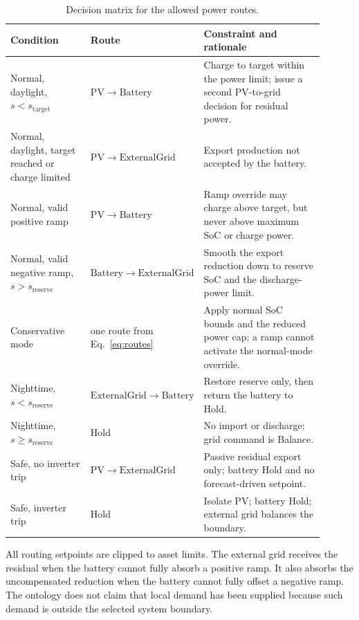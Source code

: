 \documentclass[
	letterpaper,
	10pt,
	unnumberedsections,
	twoside,
]{LTJournalArticle}
\begin{document}
\begin{table}[htbp]
\centering
\caption{Decision matrix for the allowed power routes.}
\label{tab:routing}
\small
\begin{tabular}{@{}L{0.26\linewidth}L{0.24\linewidth}L{0.40\linewidth}@{}}
\toprule
\textbf{Condition} & \textbf{Route} & \textbf{Constraint and rationale} \\
\midrule
Normal, daylight, $s<s_{\mathrm{target}}$ & $\mathrm{PV}\rightarrow\mathrm{Battery}$ & Charge to target within the power limit; issue a second PV-to-grid decision for residual power. \\
Normal, daylight, target reached or charge limited & $\mathrm{PV}\rightarrow\mathrm{ExternalGrid}$ & Export production not accepted by the battery. \\
Normal, valid positive ramp & $\mathrm{PV}\rightarrow\mathrm{Battery}$ & Ramp override may charge above target, but never above maximum SoC or charge power. \\
Normal, valid negative ramp, $s>s_{\mathrm{reserve}}$ & $\mathrm{Battery}\rightarrow\mathrm{ExternalGrid}$ & Smooth the export reduction down to reserve SoC and the discharge-power limit. \\
Conservative mode & one route from Eq.~\eqref{eq:routes} & Apply normal SoC bounds and the reduced power cap; a ramp cannot activate the normal-mode override. \\
Nighttime, $s<s_{\mathrm{reserve}}$ & $\mathrm{ExternalGrid}\rightarrow\mathrm{Battery}$ & Restore reserve only, then return the battery to Hold. \\
Nighttime, $s\geq s_{\mathrm{reserve}}$ & Hold & No import or discharge; grid command is Balance. \\
Safe, no inverter trip & $\mathrm{PV}\rightarrow\mathrm{ExternalGrid}$ & Passive residual export only; battery Hold and no forecast-driven setpoint. \\
Safe, inverter trip & Hold & Isolate PV; battery Hold; external grid balances the boundary. \\
\bottomrule
\end{tabular}
\end{table}

All routing setpoints are clipped to asset limits. The external grid receives the residual when the battery cannot fully absorb a positive ramp. It also absorbs the uncompensated reduction when the battery cannot fully offset a negative ramp. The ontology does not claim that local demand has been supplied because such demand is outside the selected system boundary.
\end{document}
